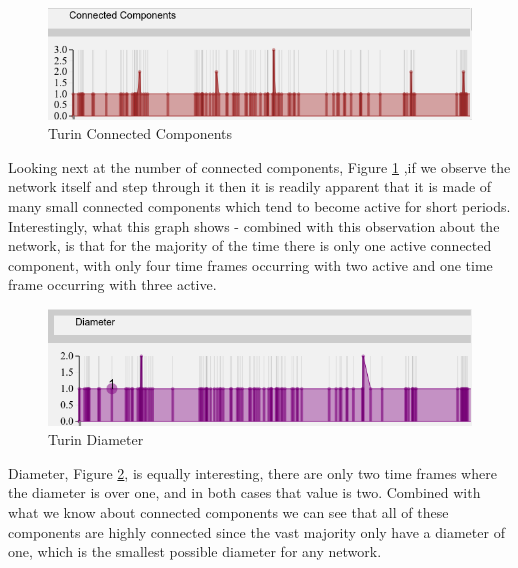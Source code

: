 \begin{center}
\end{center}  

\begin{figure}[h!]
  \begin{center}
  \includegraphics[trim={0 0 0 0}, width=140mm]{./Figures/TurinConnectedComponents.png}
  \caption{Turin Connected Components}
  \label{fig:TurinConnectedComponents}
  \end{center}
\end{figure}
Looking next at the number of connected components, Figure \ref{fig:TurinConnectedComponents} ,if we observe the network itself and step through it then it is readily apparent that it is made of many small connected components which tend to become active for short periods. Interestingly, what this graph shows - combined with this observation about the network, is that for the majority of the time there is only one active connected component, with only four time frames occurring with two active and one time frame occurring with three active.

\begin{figure}[h!]
  \begin{center}
  \includegraphics[trim={0 0 0 0}, width=140mm]{./Figures/TurinDiameter.png}
  \caption{Turin Diameter}
  \label{fig:TurinDiameter}
  \end{center}
\end{figure}
Diameter, Figure \ref{fig:TurinDiameter}, is equally interesting, there are only two time frames where the diameter is over one, and in both cases that value is two. Combined with what we know about connected components we can see that all of these components are highly connected since the vast majority only have a diameter of one, which is the smallest possible diameter for any network.
    
